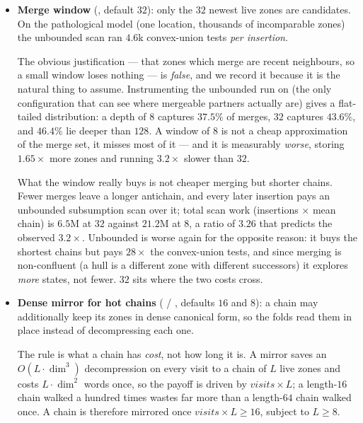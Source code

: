 \begin{itemize}[leftmargin=1.2em, itemsep=2pt]
\item \textbf{Merge window} (, default $32$): only the
      $32$ newest live zones are candidates.  On the pathological 
      model (one location, thousands of incomparable zones) the unbounded scan
      ran $4.6$k convex-union tests \emph{per insertion}.

      The obvious justification --- that zones which merge are recent
      neighbours, so a small window loses nothing --- is \emph{false}, and we
      record it because it is the natural thing to assume.  Instrumenting the
      unbounded run on  (the only configuration that can see where
      mergeable partners actually are) gives a flat-tailed distribution: a depth
      of $8$ captures $37.5\%$ of merges, $32$ captures $43.6\%$, and $46.4\%$
      lie deeper than $128$.  A window of $8$ is not a cheap approximation of the
      merge set, it misses most of it --- and it is measurably \emph{worse},
      storing $1.65\times$ more zones and running $3.2\times$ slower than $32$.

      What the window really buys is not cheaper merging but shorter chains.
      Fewer merges leave a longer antichain, and every later insertion pays an
      unbounded subsumption scan over it; total scan work (insertions $\times$
      mean chain) is $6.5$M at $32$ against $21.2$M at $8$, a ratio of $3.26$
      that predicts the observed $3.2\times$.  Unbounded is worse again for the
      opposite reason: it buys the shortest chains but pays $28\times$ the
      convex-union tests, and since merging is non-confluent (a hull is a
      different zone with different successors) it explores \emph{more} states,
      not fewer.  $32$ sits where the two costs cross.

\item \textbf{Dense mirror for hot chains} ( /
      , defaults $16$ and $8$): a chain may additionally
      keep its zones in dense canonical form, so the folds read them in place
      instead of decompressing each one.

      The rule is what a chain has \emph{cost}, not how long it is.  A mirror
      saves an $O(L \cdot \dim^3)$ decompression on every visit to a chain of $L$
      live zones and costs $L \cdot \dim^2$ words once, so the payoff is driven
      by $\mathit{visits} \times L$; a length-$16$ chain walked a hundred times
      wastes far more than a length-$64$ chain walked once.  A chain is
      therefore mirrored once $\mathit{visits} \times L \ge 16$, subject to
      $L \ge 8$.


\end{itemize}
